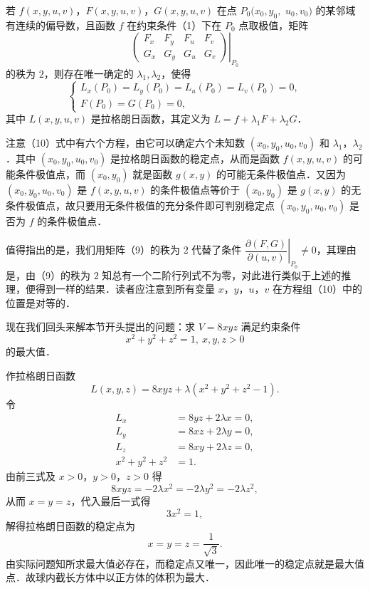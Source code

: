 \begin{theorem}\label{thm:18-3}
若 $f(x,y,u,v)$，$F(x,y,u,v)$，$G(x,y,u,v)$ 在点 $P_{0}(x_{0},y_{0},$ $u_{0},v_{0})$ 的某邻域有连续的偏导数，且函数 $f$ 在约束条件（1）下在 $P_{0}$ 点取极值，矩阵
\begin{equation}
\left.\begin{pmatrix}F_{x}&F_{y}&F_{u}&F_{v}\\ G_{x}&G_{y}&G_{u}&G_{v}\end{pmatrix}\right|_{P_{0}}
\tag{9}
\end{equation}
的秩为 $2$，则存在唯一确定的 $\lambda_{1},\lambda_{2}$，使得
\begin{equation}
\begin{cases}
L_{x}(P_{0})=L_{y}(P_{0})=L_{u}(P_{0})=L_{v}(P_{0})=0,\\
F(P_{0})=G(P_{0})=0,
\end{cases}
\tag{10}
\end{equation}
其中 $L(x,y,u,v)$ 是拉格朗日函数，其定义为 $L=f+\lambda_{1}F+\lambda_{2}G$．
\end{theorem}

注意（10）式中有六个方程，由它可以确定六个未知数 $(x_{0},y_{0},u_{0},v_{0})$ 和 $\lambda_{1}$，$\lambda_{2}$．其中 $(x_{0},y_{0},u_{0},v_{0})$ 是拉格朗日函数的稳定点，从而是函数 $f(x,y,u,v)$ 的可能条件极值点，而 $(x_{0},y_{0})$ 就是函数 $g(x,y)$ 的可能无条件极值点．又因为 $(x_{0},y_{0},u_{0},v_{0})$ 是 $f(x,y,u,v)$ 的条件极值点等价于 $(x_{0},y_{0})$ 是 $g(x,y)$ 的无条件极值点，故只要用无条件极值的充分条件即可判别稳定点 $(x_{0},y_{0},u_{0},v_{0})$ 是否为 $f$ 的条件极值点．

值得指出的是，我们用矩阵（9）的秩为 $2$ 代替了条件 $\left.\dfrac{\partial(F,G)}{\partial(u,v)}\right|_{P_{0}}\neq0$，其理由是，由（9）的秩为 $2$ 知总有一个二阶行列式不为零，对此进行类似于上述的推理，便得到一样的结果．读者应注意到所有变量 $x$，$y$，$u$，$v$ 在方程组（10）中的位置是对等的．

现在我们回头来解本节开头提出的问题：求 $V=8xyz$ 满足约束条件
\[
x^{2}+y^{2}+z^{2}=1,\ x,y,z>0
\]
的最大值．

作拉格朗日函数
\[
L(x,y,z)=8xyz+\lambda(x^{2}+y^{2}+z^{2}-1).
\]
令
\[
\begin{aligned}
L_{x}&=8yz+2\lambda x=0,\\
L_{y}&=8xz+2\lambda y=0,\\
L_{z}&=8xy+2\lambda z=0,\\
x^{2}+y^{2}+z^{2}&=1.
\end{aligned}
\]
由前三式及 $x>0$，$y>0$，$z>0$ 得
\[
8xyz=-2\lambda x^{2}=-2\lambda y^{2}=-2\lambda z^{2},
\]
从而 $x=y=z$，代入最后一式得
\[
3x^{2}=1,
\]
解得拉格朗日函数的稳定点为
\[
x=y=z=\frac{1}{\sqrt{3}}.
\]
由实际问题知所求最大值必存在，而稳定点又唯一，因此唯一的稳定点就是最大值点．故球内截长方体中以正方体的体积为最大．

